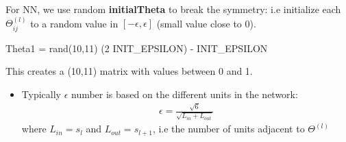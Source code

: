 \documentclass[a4paper,12pt]{report}
\begin{document}
For NN, we use random \textbf{initialTheta} to break the symmetry: i.e initialize each $\Theta_{ij}^{(l)}$ to a random value in $[-\epsilon, \epsilon]$ (small value close to 0).
\begin{tcolorbox}
\begin{python}
Theta1 = rand(10,11) \times (2 \times INIT_EPSILON) - INIT_EPSILON\end{python}
\end{tcolorbox}
This creates a (10,11) matrix with values between 0 and 1.

\begin{itemize}
\item Typically $\epsilon$ number is based on the different units in the network:
\begin{align}
\epsilon = \frac{\sqrt{6}}{\sqrt{L_{in} + L_{out}}}
\end{align}
where $L_{in}=s_l$ and $L_{out} =s_{l+1}$, i.e the number of units adjacent to $\Theta^{(l)}$
\end{itemize}
\end{document}
